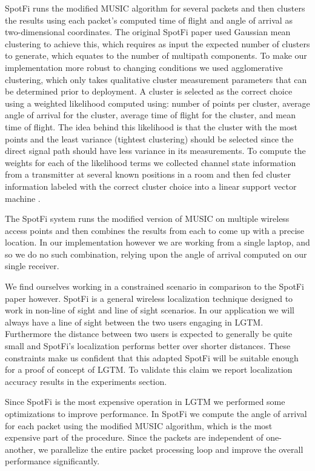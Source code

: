 \documentclass[12pt]{report}
\begin{document}
SpotFi runs the modified MUSIC algorithm for several packets and then clusters the results using each packet's computed time of flight and angle of arrival as two-dimensional coordinates. The original SpotFi paper used Gaussian mean clustering to achieve this, which requires as input the expected number of clusters to generate, which equates to the number of multipath components. To make our implementation more robust to changing conditions we used agglomerative clustering, which only takes qualitative cluster measurement parameters that can be determined prior to deployment. A cluster is selected as the correct choice using a weighted likelihood computed using: number of points per cluster, average angle of arrival for the cluster, average time of flight for the cluster, and mean time of flight. The idea behind this likelihood is that the cluster with the most points and the least variance (tightest clustering) should be selected since the direct signal path should have less variance in its measurements. To compute the weights for each of the likelihood terms we collected channel state information from a transmitter at several known positions in a room and then fed cluster information labeled with the correct cluster choice into a linear support vector machine \cite{SvmTutorialBurges1998}. \par

The SpotFi system runs the modified version of MUSIC on multiple wireless access points and then combines the results from each to come up with a precise location. In our implementation however we are working from a single laptop, and so we do no such combination, relying upon the angle of arrival computed on our single receiver. \par

We find ourselves working in a constrained scenario in comparison to the SpotFi paper however. SpotFi is a general wireless localization technique designed to work in non-line of sight and line of sight scenarios. In our application we will always have a line of sight between the two users engaging in LGTM. Furthermore the distance between two users is expected to generally be quite small and SpotFi's localization performs better over shorter distances. These constraints make us confident that this adapted SpotFi will be suitable enough for a proof of concept of LGTM. To validate this claim we report localization accuracy results in the experiments section. \par

Since SpotFi is the most expensive operation in LGTM we performed some optimizations to improve performance. In SpotFi we compute the angle of arrival for each packet using the modified MUSIC algorithm, which is the most expensive part of the procedure. Since the packets are independent of one-another, we parallelize the entire packet processing loop and improve the overall performance significantly. \par
\end{document}
